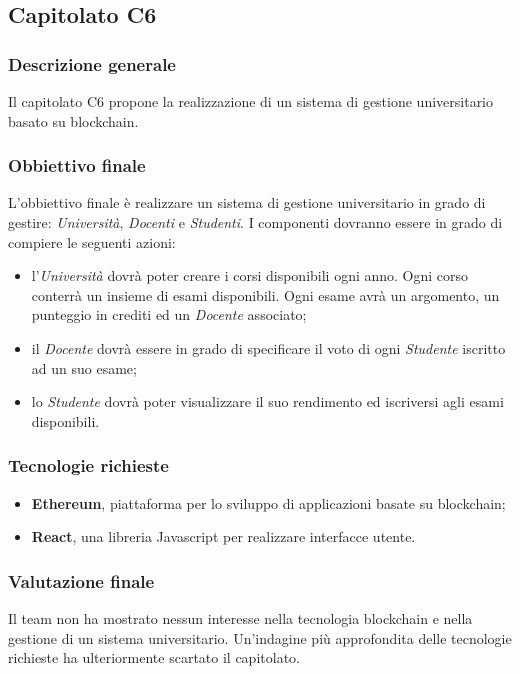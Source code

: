 \subsection{Capitolato C6}

\subsubsection{Descrizione generale}
Il capitolato C6 propone la realizzazione di un sistema di gestione universitario basato su blockchain.

\subsubsection{Obbiettivo finale}
L'obbiettivo finale è realizzare un sistema di gestione universitario in grado di gestire: \textit{Università}, \textit{Docenti} e \textit{Studenti}.
I componenti dovranno essere in grado di compiere le seguenti azioni:
\begin{itemize}
\item l'\textit{Università} dovrà poter creare i corsi disponibili ogni anno. Ogni corso conterrà un insieme di esami disponibili. Ogni esame avrà un argomento, un punteggio in crediti ed un \textit{Docente} associato;
\item il \textit{Docente} dovrà essere in grado di specificare il voto di ogni \textit{Studente} iscritto ad un suo esame;
\item lo \textit{Studente} dovrà poter visualizzare il suo rendimento ed iscriversi agli esami disponibili.
\end{itemize}

\subsubsection{Tecnologie richieste}
\begin{itemize}
\item \textbf{Ethereum}, piattaforma per lo sviluppo di applicazioni basate su blockchain;
\item \textbf{React}, una libreria Javascript per realizzare interfacce utente.
\end{itemize}

\subsubsection{Valutazione finale}
Il team non ha mostrato nessun interesse nella tecnologia blockchain e nella gestione di un sistema universitario. 
Un'indagine più approfondita delle tecnologie richieste ha ulteriormente scartato il capitolato.

